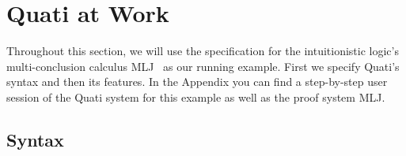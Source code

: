 \documentclass{llncs}
\begin{document}
\section{Quati at Work}
\label{sec:quati}

Throughout this section, we will use the specification for the
intuitionistic logic's multi-conclusion calculus MLJ~\cite{maehara54nmj} as our running 
example. First we specify Quati's syntax and then its features. In the Appendix
you can find a step-by-step user session of the Quati system for this example as well as the proof system MLJ. 

\vspace{-2mm}

\subsection{Syntax}
\end{document}

